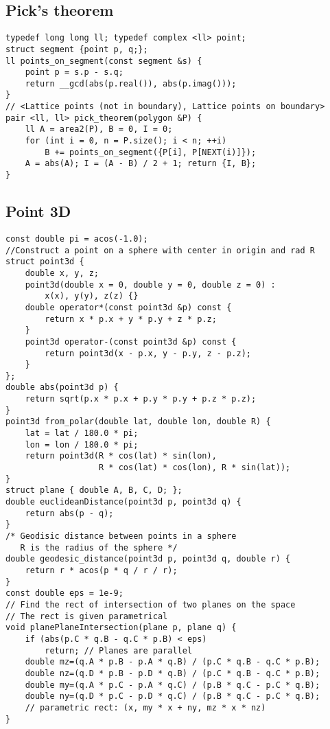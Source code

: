 \documentclass[landscape, 8pt, a4paper, oneside]{extarticle}
\begin{document}
\begin{multicols}{3}
\subsection{Pick's theorem}
\begin{verbatim}
typedef long long ll; typedef complex <ll> point;
struct segment {point p, q;};
ll points_on_segment(const segment &s) {
    point p = s.p - s.q;
    return __gcd(abs(p.real()), abs(p.imag()));
}
// <Lattice points (not in boundary), Lattice points on boundary>
pair <ll, ll> pick_theorem(polygon &P) {
    ll A = area2(P), B = 0, I = 0;
    for (int i = 0, n = P.size(); i < n; ++i)
        B += points_on_segment({P[i], P[NEXT(i)]});
    A = abs(A); I = (A - B) / 2 + 1; return {I, B};
}
\end{verbatim}
\subsection{Point 3D}
\begin{verbatim}
const double pi = acos(-1.0);
//Construct a point on a sphere with center in origin and rad R
struct point3d {
    double x, y, z;
    point3d(double x = 0, double y = 0, double z = 0) :
        x(x), y(y), z(z) {}
    double operator*(const point3d &p) const {
        return x * p.x + y * p.y + z * p.z;
    }
    point3d operator-(const point3d &p) const {
        return point3d(x - p.x, y - p.y, z - p.z);
    }
};
double abs(point3d p) {
    return sqrt(p.x * p.x + p.y * p.y + p.z * p.z);
}
point3d from_polar(double lat, double lon, double R) {
    lat = lat / 180.0 * pi;
    lon = lon / 180.0 * pi;
    return point3d(R * cos(lat) * sin(lon),
                   R * cos(lat) * cos(lon), R * sin(lat));
}
struct plane { double A, B, C, D; };
double euclideanDistance(point3d p, point3d q) {
    return abs(p - q);
}
/* Geodisic distance between points in a sphere
   R is the radius of the sphere */
double geodesic_distance(point3d p, point3d q, double r) {
    return r * acos(p * q / r / r);
}
const double eps = 1e-9;
// Find the rect of intersection of two planes on the space
// The rect is given parametrical
void planePlaneIntersection(plane p, plane q) {
    if (abs(p.C * q.B - q.C * p.B) < eps)
        return; // Planes are parallel
    double mz=(q.A * p.B - p.A * q.B) / (p.C * q.B - q.C * p.B);
    double nz=(q.D * p.B - p.D * q.B) / (p.C * q.B - q.C * p.B);
    double my=(q.A * p.C - p.A * q.C) / (p.B * q.C - p.C * q.B);
    double ny=(q.D * p.C - p.D * q.C) / (p.B * q.C - p.C * q.B);
    // parametric rect: (x, my * x + ny, mz * x * nz)
}
\end{verbatim}

\end{multicols}
\end{document}
